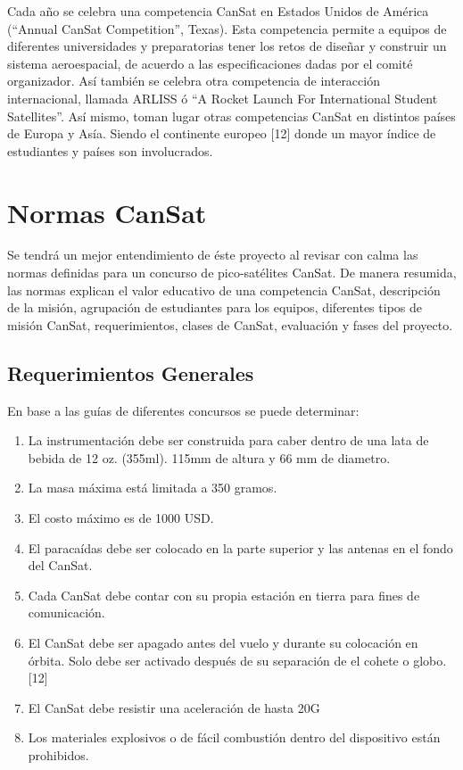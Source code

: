 Cada a\~{n}o se celebra una competencia CanSat en Estados Unidos de Am\'{e}rica (“Annual CanSat Competition”, Texas). Esta competencia permite a equipos de diferentes universidades y preparatorias tener los retos de dise\~{n}ar y construir un sistema aeroespacial, de acuerdo a las especificaciones dadas por el comit\'{e} organizador. As\'{i} tambi\'{e}n se celebra otra competencia de interacci\'{o}n internacional, llamada ARLISS \'{o} “A Rocket Launch For International Student Satellites”.
As\'{i} mismo, toman lugar otras competencias CanSat en distintos pa\'{i}ses de Europa y As\'{i}a. Siendo el continente europeo [12] donde un mayor \'{i}ndice de estudiantes y pa\'{i}ses son involucrados.



\section{Normas CanSat} %
Se tendr\'{a} un mejor entendimiento de \'{e}ste proyecto al revisar con calma las normas definidas para un concurso de pico-sat\'{e}lites CanSat. De manera resumida, las normas explican el valor educativo de una competencia CanSat, descripci\'{o}n de la misi\'{o}n, agrupaci\'{o}n de estudiantes para los equipos, diferentes tipos de misi\'{o}n CanSat, requerimientos, clases de CanSat, evaluaci\'{o}n y fases del proyecto.


\subsection{Requerimientos Generales}
En base a las gu\'{i}as de diferentes concursos se puede determinar:
\begin{enumerate}
\item La instrumentaci\'{o}n debe ser construida para caber dentro de una lata de bebida de 12 oz. (355ml). 115mm de altura y 66 mm de diametro.
\item La masa m\'{a}xima est\'{a} limitada a 350 gramos.
\item El costo m\'{a}ximo es de 1000 USD.
\item El paraca\'{i}das debe ser colocado en la parte superior y las antenas en el fondo del CanSat.
\item Cada CanSat debe contar con su propia estaci\'{o}n en tierra para fines de comunicaci\'{o}n.
\item El CanSat debe ser apagado antes del vuelo y durante su colocaci\'{o}n en \'{o}rbita. Solo debe ser activado despu\'{e}s de su separaci\'{o}n de el cohete o globo. [12]
\item El CanSat debe resistir una aceleraci\'{o}n de hasta 20G
\item Los materiales explosivos o de f\'{a}cil combusti\'{o}n dentro del dispositivo est\'{a}n prohibidos.
\end{enumerate}

